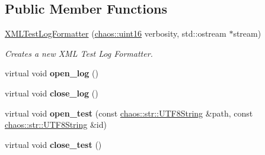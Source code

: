 \subsection*{Public Member Functions}
\begin{DoxyCompactItemize}
\item 
\hypertarget{classchaos_1_1test_1_1log__formatter_1_1_x_m_l_test_log_formatter_a8d1b98b0cf9a475b4ed5984b2b9a3435}{\hyperlink{classchaos_1_1test_1_1log__formatter_1_1_x_m_l_test_log_formatter_a8d1b98b0cf9a475b4ed5984b2b9a3435}{X\-M\-L\-Test\-Log\-Formatter} (\hyperlink{namespacechaos_ac3888b1c9e56da7fbbdb3ab8425b4068}{chaos\-::uint16} verbosity, std\-::ostream $\ast$stream)}\label{classchaos_1_1test_1_1log__formatter_1_1_x_m_l_test_log_formatter_a8d1b98b0cf9a475b4ed5984b2b9a3435}

\begin{DoxyCompactList}\small\item\em Creates a new X\-M\-L Test Log Formatter. \end{DoxyCompactList}\item 
\hypertarget{classchaos_1_1test_1_1log__formatter_1_1_x_m_l_test_log_formatter_a4103c24daf83bff69ad23ba4a7d7e2ad}{virtual void {\bfseries open\-\_\-log} ()}\label{classchaos_1_1test_1_1log__formatter_1_1_x_m_l_test_log_formatter_a4103c24daf83bff69ad23ba4a7d7e2ad}

\item 
\hypertarget{classchaos_1_1test_1_1log__formatter_1_1_x_m_l_test_log_formatter_a5eed2684e7c75ac55f18417d675d3e5a}{virtual void {\bfseries close\-\_\-log} ()}\label{classchaos_1_1test_1_1log__formatter_1_1_x_m_l_test_log_formatter_a5eed2684e7c75ac55f18417d675d3e5a}

\item 
\hypertarget{classchaos_1_1test_1_1log__formatter_1_1_x_m_l_test_log_formatter_a75659e6702e789ad344c061ab65a89c5}{virtual void {\bfseries open\-\_\-test} (const \hyperlink{classchaos_1_1str_1_1_u_t_f8_string}{chaos\-::str\-::\-U\-T\-F8\-String} \&path, const \hyperlink{classchaos_1_1str_1_1_u_t_f8_string}{chaos\-::str\-::\-U\-T\-F8\-String} \&id)}\label{classchaos_1_1test_1_1log__formatter_1_1_x_m_l_test_log_formatter_a75659e6702e789ad344c061ab65a89c5}

\item 
\hypertarget{classchaos_1_1test_1_1log__formatter_1_1_x_m_l_test_log_formatter_a7887aa75de5772511a8f2d3274514343}{virtual void {\bfseries close\-\_\-test} ()}\label{classchaos_1_1test_1_1log__formatter_1_1_x_m_l_test_log_formatter_a7887aa75de5772511a8f2d3274514343}


\end{DoxyCompactItemize}
